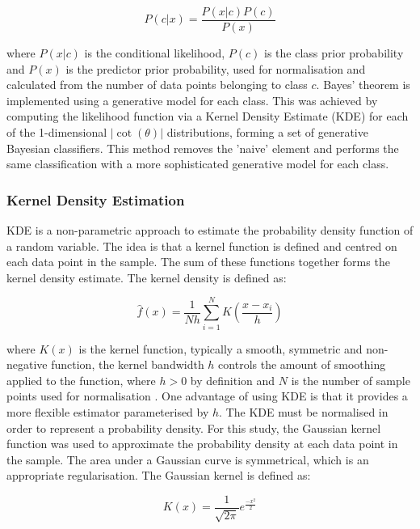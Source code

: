 \begin{equation} \label{naive-bayes}
    P(c|x) = \frac{P(x|c)P(c)}{P(x)}
\end{equation}

where $P(x|c)$ is the conditional likelihood, $P(c)$ is the class prior probability and $P(x)$ is the predictor prior probability, used for normalisation and calculated from the number of data points belonging to class $c$. Bayes' theorem is implemented using a generative model for each class. This was achieved by computing the likelihood function via a Kernel Density Estimate (KDE) for each of the 1-dimensional $|\cot(\theta)|$ distributions, forming a set of generative Bayesian classifiers. This method removes the 'naive' element and performs the same classification with a more sophisticated generative model for each class.

\subsubsection{Kernel Density Estimation}

KDE is a non-parametric approach to estimate the probability density function of a random variable. The idea is that a kernel function is defined and centred on each data point in the sample. The sum of these functions together forms the kernel density estimate. The kernel density is defined as:
    
\begin{equation} \label{eq2}
    \hat{f}(x) = \frac{1}{Nh}  \sum_{i=1}^{N} K \left( \frac{x - x_i}{h} \right)
\end{equation}

where $K(x)$ is the kernel function, typically a smooth, symmetric and non-negative function, the kernel bandwidth $h$ controls the amount of smoothing applied to the function, where  $h > 0$ by definition and $N$ is the number of sample points used for normalisation \cite{kde}. One advantage of using KDE is that it provides a more flexible estimator parameterised by $h$. The KDE must be normalised in order to represent a probability density. For this study, the Gaussian kernel function was used to approximate the probability density at each data point in the sample. The area under a Gaussian curve is symmetrical, which is an appropriate regularisation. The Gaussian kernel is defined as:
    
\begin{equation} \label{eq3}
    K(x) = \frac{1}{\sqrt{2\pi}} e^{\frac{-x^2}{2}}
\end{equation}

